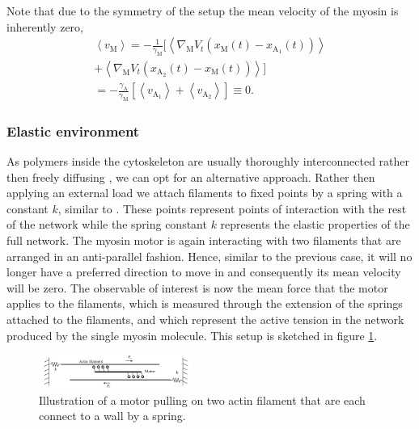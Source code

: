 \documentclass[aps,pre,twocolumn,showpacs,showkeys,superscriptaddress,floatfix]{revtex4-1}
\begin{document}
Note that due to the symmetry of the setup the mean velocity of the myosin is inherently zero,
\begin{multline*}
\left\langle v_\text{M} \right\rangle 
= - \frac{1}{\gamma_\text{M}} \bigl[ 
\left\langle \nabla_\text{M} V_t(x_\text{M}(t) - x_{\text{A}_1}(t)) \right\rangle
\\ 
+ \left\langle \nabla_\text{M} V_t(x_{\text{A}_2}(t) - x_\text{M}(t)) \right\rangle 
\bigr] 
\\
= - \frac{\gamma_\text{A}}{\gamma_\text{M}} \left[ 
\left\langle v_{\text{A}_1} \right\rangle 
+ \left\langle v_{\text{A}_2} \right\rangle 
\right]
\equiv 0 . 
\end{multline*}

\subsubsection{Elastic environment}
\label{sec:environment}
As polymers inside the cytoskeleton are usually thoroughly interconnected rather then freely diffusing \cite{blanchoin2014actin,ennomani2016architecture},
we can opt for an alternative approach.
Rather then applying an external load we attach filaments to fixed points by a spring with a constant $k$, similar to \cite{albert2014stochastic}. 
These points represent points of interaction with the rest of the network while the spring constant $k$ represents the elastic properties of the full network. 
The myosin motor is again interacting with two filaments that are arranged in an anti-parallel fashion. 
Hence, similar to the previous case, it will no longer have a preferred direction to move in and consequently its mean velocity will be zero. 
The observable of interest is now the mean force that the motor applies to the filaments, 
which is measured through the extension of the springs attached to the filaments,
and which represent the active tension in the network produced by the single myosin molecule. 
This setup is sketched in figure \ref{fig:tug}. 
\begin{figure}[t]
\centering
\includegraphics[width=0.45\textwidth,height=!]{tug}
\caption{
\label{fig:tug}
Illustration of a motor pulling on two actin filament that are each connect to a wall by a spring.
}
\end{figure}
\end{document}
